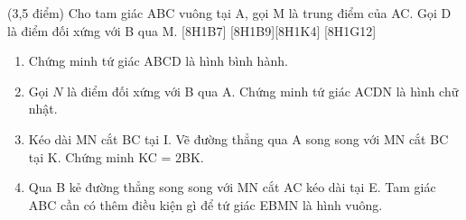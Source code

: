 \documentclass[12pt,a4paper,oneside]{book}
\begin{document}
\begin{ex}
	(3,5 điểm)
	Cho tam giác ABC vuông tại A, gọi M là trung điểm của AC. Gọi D là điểm đối xứng với B qua M. [8H1B7] [8H1B9][8H1K4] [8H1G12]
    \begin{enumerate}
    \item Chứng minh tứ giác ABCD là hình bình hành.
   \item Gọi $N$ là điểm đối xứng với B qua A. Chứng minh tứ giác ACDN là hình chữ nhật.
   \item Kéo dài MN cắt BC tại I. Vẽ đường thẳng qua A song song với MN cắt BC tại K. Chứng minh KC = 2BK.
   \item Qua B kẻ đường thẳng song song với MN cắt AC kéo dài tại E. Tam giác ABC cần có thêm điều kiện gì để tứ giác EBMN là hình vuông.
    \end{enumerate}
\loigiai
    {
    	
}
\end{ex}
\end{document}
